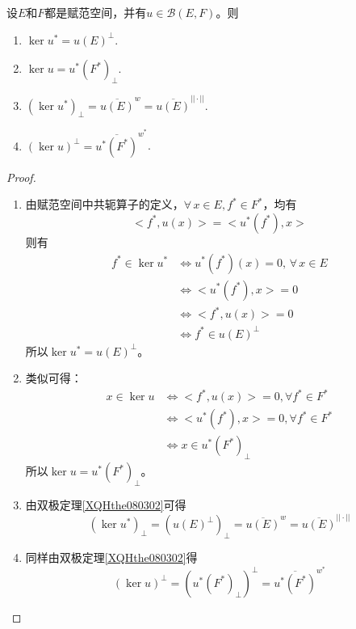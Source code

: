 \begin{theorem}[可能的考点]
    设$E$和$F$都是赋范空间，并有$u\in \mathcal{B}(E,F)$。则
    \begin{enumerate}
        \item $\ker u^{*}=u(E)^{\perp}$.
        \item $\ker u=u^{*}(F^{*})_{\perp}$.
        \item $(\ker u^{*})_{\perp}=\overline{u(E)}^{w}=\overline{u(E)}^{||\cdot||}$.
        \item $(\ker u)^{\perp}=\overline{u^{*}(F^{*})}^{w^{*}}$.
    \end{enumerate}
\end{theorem}

\begin{proof}
    \begin{enumerate}
        \item 由赋范空间中共轭算子的定义，$\forall \, x\in E,f^{*}\in F^{*}$，均有
        \begin{equation*}
            <f^{*},u(x)>=<u^{*}(f^{*}),x>
        \end{equation*}
        则有
        \begin{equation*}
            \begin{aligned}
                f^{*}\in \ker u^{*}&\Leftrightarrow u^{*}(f^{*})(x)=0,\,\forall \,x\in E\\
                &\Leftrightarrow <u^{*}(f^{*}),x>=0\\
                &\Leftrightarrow <f^{*},u(x)>=0\\
                &\Leftrightarrow f^{*}\in u(E)^{\perp}
            \end{aligned}
        \end{equation*}
        所以$\ker u^{*}=u(E)^{\perp }$。
        \item 类似可得：
        \begin{equation*}
            \begin{aligned}
            x\in \ker u&\Leftrightarrow <f^{*},u(x)>=0,\forall f^{*}\in F^{*}\\
            &\Leftrightarrow <u^{*}(f^{*}),x>=0,\forall f^{*}\in F^{*}\\
            &\Leftrightarrow x\in u^{*}(F^{*})_{\perp}     
            \end{aligned}
        \end{equation*}
        所以$\ker u=u^{*}(F^{*})_{\perp}$。
        \item 由双极定理\ref{XQHthe080302}可得
        \begin{equation*}
            (\ker u^{*})_{\perp}=(u(E)^{\perp})_{\perp}=\overline{u(E)}^{w}=\overline{u(E)}^{||\cdot||}
        \end{equation*}
        \item 同样由双极定理\ref{XQHthe080302}得
        \begin{equation*}
            (\ker u)^{\perp}=(u^{*}(F^{*})_{\perp})^{\perp}=\overline{u^{*}(F^{*})}^{w^{*}}
        \end{equation*}
    \end{enumerate}
\end{proof}

